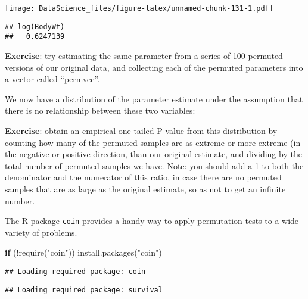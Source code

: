 \documentclass[
]{book}
\newenvironment{Shaded}{\begin{snugshade}}{\end{snugshade}}
\newcommand{\AttributeTok}[1]{\textcolor[rgb]{0.77,0.63,0.00}{#1}}
\newcommand{\ControlFlowTok}[1]{\textcolor[rgb]{0.13,0.29,0.53}{\textbf{#1}}}
\newcommand{\DecValTok}[1]{\textcolor[rgb]{0.00,0.00,0.81}{#1}}
\newcommand{\FunctionTok}[1]{\textcolor[rgb]{0.00,0.00,0.00}{#1}}
\newcommand{\NormalTok}[1]{#1}
\newcommand{\OtherTok}[1]{\textcolor[rgb]{0.56,0.35,0.01}{#1}}
\newcommand{\SpecialCharTok}[1]{\textcolor[rgb]{0.00,0.00,0.00}{#1}}
\newcommand{\StringTok}[1]{\textcolor[rgb]{0.31,0.60,0.02}{#1}}
\begin{document}
\texttt{[image: DataScience\_files/figure-latex/unnamed-chunk-131-1.pdf]}

\begin{Shaded}
\end{Shaded}

\begin{verbatim}
## log(BodyWt) 
##   0.6247139
\end{verbatim}

\textbf{Exercise}: try estimating the same parameter from a series of 100 permuted versions of our original data, and collecting each of the permuted parameters into a vector called ``permvec''.

We now have a distribution of the parameter estimate under the assumption that there is no relationship between these two variables:

\textbf{Exercise}: obtain an empirical one-tailed P-value from this distribution by counting how many of the permuted samples are as extreme or more extreme (in the negative or positive direction, than our original estimate, and dividing by the total number of permuted samples we have. Note: you should add a 1 to both the denominator and the numerator of this ratio, in case there are no permuted samples that are as large as the original estimate, so as not to get an infinite number.

The R package \texttt{coin} provides a handy way to apply permutation tests to a wide variety of problems.

\begin{Shaded}
\begin{Highlighting}[]
\ControlFlowTok{if}\NormalTok{ (}\SpecialCharTok{!}\FunctionTok{require}\NormalTok{(}\StringTok{"coin"}\NormalTok{)) }\FunctionTok{install.packages}\NormalTok{(}\StringTok{"coin"}\NormalTok{)}
\end{Highlighting}
\end{Shaded}

\begin{verbatim}
## Loading required package: coin
\end{verbatim}

\begin{verbatim}
## Loading required package: survival
\end{verbatim}
\end{document}
